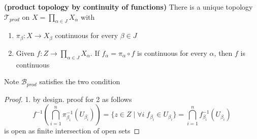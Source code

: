 \documentclass[10.5pt]{article}
\newcommand{\calB}{\mathcal{B}}
\newcommand{\calT}{\mathcal{T}}
\begin{document}
\begin{defn*}
    \textbf{(product topology by continuity of functions)} There is a unique topology $\calT_{prod}$ on $\textstyle X = \prod_{\alpha\in J} X_{\alpha}$ with
    \begin{enumerate}
        \item $\pi_{\beta}: X \to X_{\beta}$ continuous for every $\beta\in J$
        \item Given $\textstyle f:Z \to \prod_{\alpha\in J} X_{\alpha}$. If $f_{\alpha} = \pi_{\alpha} \circ f$ is continuous for every $\alpha$, then $f$ is continuous
    \end{enumerate}
    Note $\calB_{prod}$ satisfies the two condition
    \begin{proof}
        1. by design. proof for 2 as follows 
        \[
            f^{-1}\left(\bigcap_{i=1}^n \pi_{\beta_i}^{-1}(U_{\beta_i})\right)
            = \{z\in Z \mid \forall i \; f_{\beta_i} \in U_{\beta_i}\}
            = \bigcap_{i=1}^n f^{-1}_{\beta_i} (U_{\beta_i})
        \]
        is open as finite intersection of open sets
    \end{proof}
\end{defn*}
\end{document}
